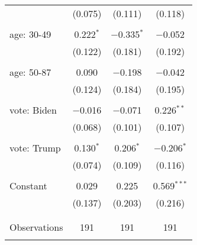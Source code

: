 \begin{tabular}{@{\extracolsep{5pt}}lccc}
  & (0.075) & (0.111) & (0.118) \\ 
  & & & \\ 
 age: 30-49 & 0.222$^{*}$ & $-$0.335$^{*}$ & $-$0.052 \\ 
  & (0.122) & (0.181) & (0.192) \\ 
  & & & \\ 
 age: 50-87 & 0.090 & $-$0.198 & $-$0.042 \\ 
  & (0.124) & (0.184) & (0.195) \\ 
  & & & \\ 
 vote: Biden & $-$0.016 & $-$0.071 & 0.226$^{**}$ \\ 
  & (0.068) & (0.101) & (0.107) \\ 
  & & & \\ 
 vote: Trump & 0.130$^{*}$ & 0.206$^{*}$ & $-$0.206$^{*}$ \\ 
  & (0.074) & (0.109) & (0.116) \\ 
  & & & \\ 
 Constant & 0.029 & 0.225 & 0.569$^{***}$ \\ 
  & (0.137) & (0.203) & (0.216) \\ 
  & & & \\ 
\hline \\[-1.8ex] 

Observations & 191 & 191 & 191 \\ 
\hline 
\hline \\[-1.8ex] 
\end{tabular} 